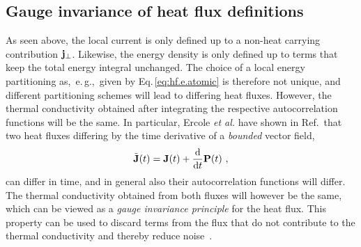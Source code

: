 \subsection{Gauge invariance of heat flux definitions}
\label{sec:gauge_invariance}
As seen above, the local current is only defined up to a non-heat carrying contribution ${\bf j}_{\perp}$. Likewise, the energy density is only defined up to terms that keep the total energy integral unchanged. The choice of a local energy partitioning as,~e.\,g.,~given by Eq.\,\eqref{eq:hf.e.atomic} is therefore not unique, and different partitioning schemes will lead to differing heat fluxes. However, the thermal conductivity obtained after integrating the respective autocorrelation functions will be the same. In particular, Ercole \emph{et al.} have shown in Ref.\,\cite{Ercole2016} that two heat fluxes differing by the time derivative of a \emph{bounded} vector field,
\begin{align}
  \tilde{{\bf J}} (t) = {\bf J} (t) + \frac{{\rm d}}{{\rm d} t} {\bf P} (t)~,
\end{align}
can differ in time, and in general also their autocorrelation functions will differ. The thermal conductivity obtained from both fluxes will however be the same, which can be viewed as a \emph{gauge invariance principle} for the heat flux. This property can be used to discard terms from the flux that do not contribute to the thermal conductivity and thereby reduce noise~\cite{Marcolongo2020}. 


